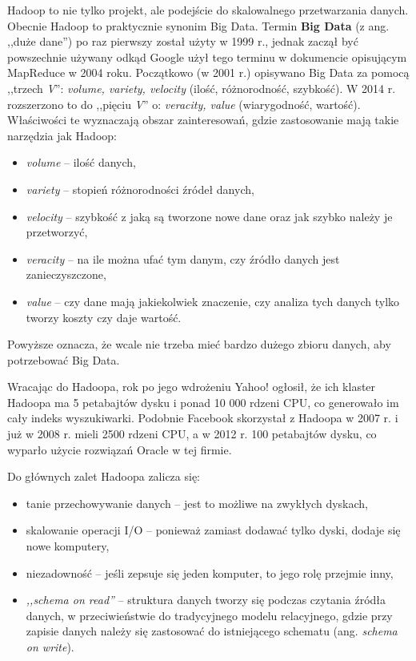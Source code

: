 \documentclass[12pt,a4paper,twoside,titlepage,openright]{book}
\begin{document}
Hadoop to nie tylko projekt, ale podejście do skalowalnego przetwarzania danych. \cite{hadoop} Obecnie Hadoop to praktycznie synonim Big Data. \cite{bigData} Termin \textbf{Big Data} (z ang. ,,duże dane'') po raz pierwszy został użyty w 1999 r., jednak zaczął być powszechnie używany odkąd Google użył tego terminu w dokumencie opisującym MapReduce w 2004 roku. Początkowo (w 2001 r.) opisywano Big Data za pomocą ,,trzech \textit{V}'': \textit{volume, variety, velocity} (ilość, różnorodność, szybkość). W 2014 r. rozszerzono to do ,,pięciu \textit{V}'' o: \textit{veracity, value} (wiarygodność, wartość).\cite{realTimeProcessing} Właściwości te wyznaczają obszar zainteresowań, gdzie zastosowanie mają takie narzędzia jak Hadoop:
\begin{itemize}
\item \textit{volume} -- ilość danych,
\item \textit{variety} -- stopień różnorodności źródeł danych,
\item \textit{velocity} -- szybkość z jaką są tworzone nowe dane oraz jak szybko należy je przetworzyć,
\item \textit{veracity} -- na ile można ufać tym danym, czy źródło danych jest zanieczyszczone,
\item \textit{value} -- czy dane mają jakiekolwiek znaczenie, czy analiza tych danych tylko tworzy koszty czy daje wartość.
\end{itemize}
Powyższe oznacza, że wcale nie trzeba mieć bardzo dużego zbioru danych, aby potrzebować Big Data. \cite{hadoop}

Wracając do Hadoopa, rok po jego wdrożeniu Yahoo! ogłosił, że ich klaster Hadoopa ma 5 petabajtów dysku i ponad 10 000 rdzeni CPU, co generowało im cały indeks wyszukiwarki. Podobnie Facebook skorzystał z Hadoopa w 2007 r. i już w 2008 r. mieli 2500 rdzeni CPU, a w 2012 r. 100 petabajtów dysku, co wyparło użycie rozwiązań Oracle w tej firmie.

Do głównych zalet Hadoopa zalicza się:
\begin{itemize}
\item tanie przechowywanie danych -- jest to możliwe na zwykłych dyskach,
\item skalowanie operacji I/O -- ponieważ zamiast dodawać tylko dyski, dodaje się nowe komputery,
\item niezadowność -- jeśli zepsuje się jeden komputer, to jego rolę przejmie inny,
\item \textit{,,schema on read''} -- struktura danych tworzy się podczas czytania źródła danych, w przeciwieństwie do tradycyjnego modelu relacyjnego, gdzie przy zapisie danych należy się zastosować do istniejącego schematu (ang. \textit{schema on write}).
\end{itemize}
\end{document}
